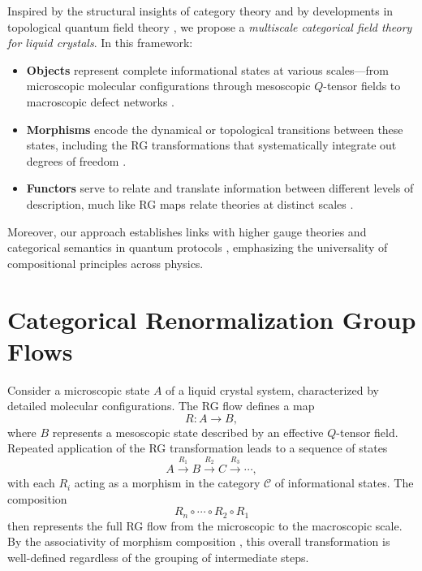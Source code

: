 	Inspired by the structural insights of category theory \cite{maclane1971categories, spivak2014category} and by developments in topological quantum field theory \cite{atiyah1988topological, segal2004definition, freed1995chern}, we propose a \emph{multiscale categorical field theory for liquid crystals}. In this framework:
	\begin{itemize}
		\item \textbf{Objects} represent complete informational states at various scales—from microscopic molecular configurations through mesoscopic \(Q\)-tensor fields to macroscopic defect networks \cite{degennes1993physics}.
		\item \textbf{Morphisms} encode the dynamical or topological transitions between these states, including the RG transformations that systematically integrate out degrees of freedom \cite{cardy1996scaling, ma1976modern}.
		\item \textbf{Functors} serve to relate and translate information between different levels of description, much like RG maps relate theories at distinct scales \cite{baez2011rosetta, abramsky2004categorical}.
	\end{itemize}
	
	Moreover, our approach establishes links with higher gauge theories \cite{baez2007higher} and categorical semantics in quantum protocols \cite{selinger2007dagger, abramsky2004categorical}, emphasizing the universality of compositional principles across physics.
	
	\section{Categorical Renormalization Group Flows}
	
	Consider a microscopic state \(A\) of a liquid crystal system, characterized by detailed molecular configurations. The RG flow defines a map 
	\[
	R: A \to B,
	\]
	where \(B\) represents a mesoscopic state described by an effective \(Q\)-tensor field. Repeated application of the RG transformation leads to a sequence of states
	\[
	A \xrightarrow{R_1} B \xrightarrow{R_2} C \xrightarrow{R_3} \cdots,
	\]
	with each \(R_i\) acting as a morphism in the category \(\mathcal{C}\) of informational states. The composition
	\[
	R_{n} \circ \cdots \circ R_2 \circ R_1
	\]
	then represents the full RG flow from the microscopic to the macroscopic scale. By the associativity of morphism composition \cite{maclane1971categories}, this overall transformation is well-defined regardless of the grouping of intermediate steps.
	
